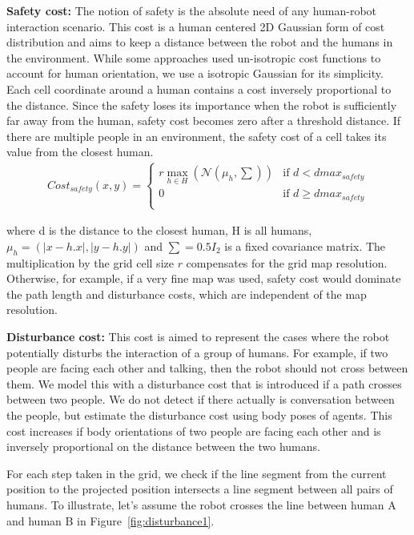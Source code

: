 \textbf{Safety cost:} The notion of safety is the absolute need of any human-robot interaction scenario. This cost is a human centered 2D Gaussian form of cost distribution and aims to keep a distance between the robot and the humans in the environment. While some approaches used un-isotropic cost functions to account for human orientation, we use a isotropic Gaussian for its simplicity. Each cell coordinate around a human contains a cost inversely proportional to the distance. Since the safety loses its importance when the robot is sufficiently far away from the human, safety cost becomes zero after a threshold distance. If there are multiple people in an environment, the safety cost of a cell takes its value from the closest human.
\begin{align}
Cost_{safety}(x,y)=\left\{ \begin{array}{cl}
r\max_{h\in H}(\mathcal{N}(\mu_h,\sum)) & \textrm{if $d<dmax_{safety}$}\\
0 & \textrm{if $d\geq dmax_{safety}$}\\
\end{array}\right.
\end{align}

where d is the distance to the closest human, H is all humans, $\mu_h = (|x - h.x|,|y - h.y|)$ and $\sum = 0.5I_2$ is a fixed covariance matrix. The multiplication by the grid cell size $r$ compensates for the grid map resolution. Otherwise, for example, if a very fine map was used, safety cost would dominate the path length and disturbance costs, which are independent of the map resolution.
 
\textbf{Disturbance cost:} This cost is aimed to represent the cases where the robot potentially disturbs the interaction of a group of humans. For example, if two people are facing each other and talking, then the robot should not cross between them.  We model this with a disturbance cost that is introduced if a path crosses between two people. We do not detect if there actually is conversation between the people, but estimate the disturbance cost using body poses of agents. This cost increases if body orientations of two people are facing each other and is inversely proportional on the distance between the two humans.

For each step taken in the grid, we check if the line segment from the current position to the  projected position intersects a line segment between all pairs of humans. To illustrate, let's assume the robot crosses the line between human A and human B in Figure~\ref{fig:disturbance1}. 

